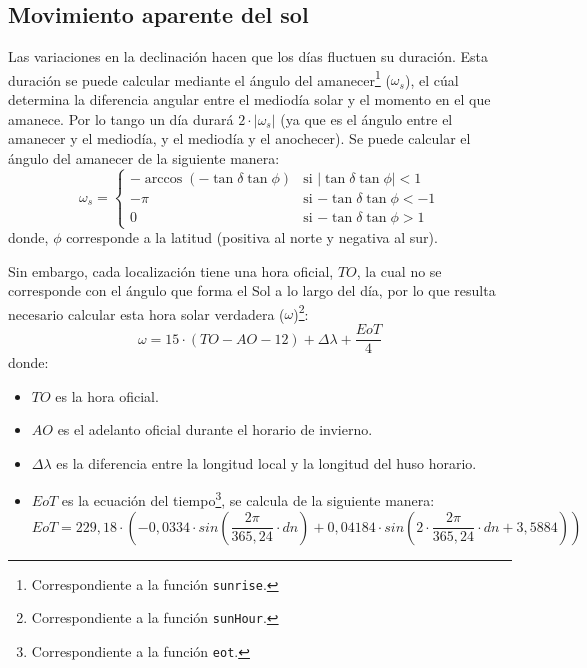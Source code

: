 \subsection{Movimiento aparente del sol}
\label{sec:orgc907eca}
Las variaciones en la declinación hacen que los días fluctuen su duración. Esta duración se puede calcular mediante el ángulo del amanecer\footnote{Correspondiente a la función \texttt{sunrise}.} (\(\omega_s\)), el cúal determina la diferencia angular entre el mediodía solar y el momento en el que amanece. Por lo tango un día durará \(2\cdot |\omega_s|\) (ya que es el ángulo entre el amanecer y el mediodía, y el mediodía y el anochecer). Se puede calcular el ángulo del amanecer de la siguiente manera: 
\begin{equation}
  \omega_s=\begin{cases}
  -\arccos(-\tan\delta\tan\phi)& \text{si $|\tan\delta\tan\phi|<1$}\\
  -\pi& \text{si $-\tan\delta\tan\phi<-1$}\\
  0& \text{si $-\tan\delta\tan\phi>1$}
  \end{cases}
\end{equation}
donde, \(\phi\) corresponde a la latitud (positiva al norte y negativa al sur). 

Sin embargo, cada localización tiene una hora oficial, \(TO\), la cual no se corresponde con el ángulo que forma el Sol a lo largo del día, por lo que resulta necesario calcular esta hora solar verdadera (\(\omega\))\footnote{Correspondiente a la función \texttt{sunHour}.}:  
\begin{equation}
\omega = 15 \cdot (TO-AO-12)+\Delta \lambda + \frac{EoT}{4}
\end{equation}
donde:
\begin{itemize}
\item \(TO\) es la hora oficial.
\item \(AO\) es el adelanto oficial durante el horario de invierno. 
\item \(\Delta \lambda\) es la diferencia entre la longitud local y la longitud del huso horario. 
\item \(EoT\) es la ecuación del tiempo\footnote{Correspondiente a la función \texttt{eot}.}, se calcula de la siguiente manera: 
\begin{equation}
EoT=229,18\cdot (-0,0334\cdot sin(\frac{2\pi}{365,24}\cdot dn)+0,04184\cdot sin(2\cdot \frac{2\pi}{365,24}\cdot dn+3,5884))
\end{equation}
\end{itemize}

